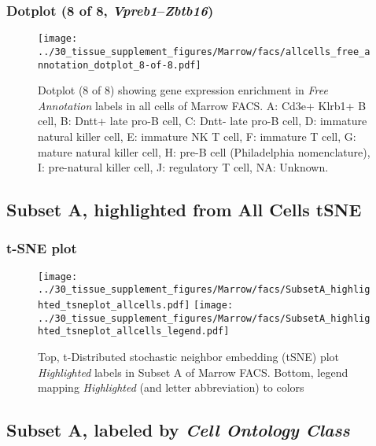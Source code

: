 \clearpage

\subsubsection{Dotplot (8 of 8, \emph{Vpreb1}--\emph{Zbtb16})}
\begin{figure}[h]
\centering
\texttt{[image: ../30\_tissue\_supplement\_figures/Marrow/facs/allcells\_free\_annotation\_dotplot\_8-of-8.pdf]}

\caption{ Dotplot (8 of 8)  showing gene expression enrichment in \emph{Free Annotation} labels in all cells of Marrow FACS. A: Cd3e+ Klrb1+ B cell, B: Dntt+ late pro-B cell, C: Dntt- late pro-B cell, D: immature natural killer cell, E: immature NK T cell, F: immature T cell, G: mature natural killer cell, H: pre-B cell (Philadelphia nomenclature), I: pre-natural killer cell, J: regulatory T cell, NA: Unknown.}
\end{figure}


\clearpage
\subsection{Subset A, highlighted from All Cells tSNE}
\subsubsection{t-SNE plot}
\begin{figure}[h]
\centering
\texttt{[image: ../30\_tissue\_supplement\_figures/Marrow/facs/SubsetA\_highlighted\_tsneplot\_allcells.pdf]}
\texttt{[image: ../30\_tissue\_supplement\_figures/Marrow/facs/SubsetA\_highlighted\_tsneplot\_allcells\_legend.pdf]}
\caption{Top, t-Distributed stochastic neighbor embedding (tSNE) plot  \emph{Highlighted} labels in Subset A of Marrow FACS. Bottom, legend mapping \emph{Highlighted} (and letter abbreviation) to colors}
\end{figure}


\clearpage

\subsection{Subset A, labeled by \emph{Cell Ontology Class}}
